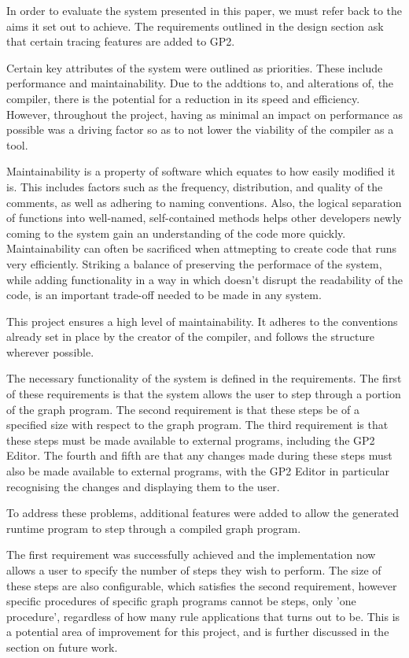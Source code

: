 \documentclass{UoYCSproject}
\begin{document}
In order to evaluate the system presented in this paper, we must refer back to the aims it set out to achieve. The requirements outlined in the design section ask that certain tracing features are added to GP2. 

Certain key attributes of the system were outlined as priorities. These include performance and maintainability.
Due to the addtions to, and alterations of, the compiler, there is the potential for a reduction in its speed and efficiency. However, throughout the project, having as minimal an impact on performance as possible was a driving factor so as to not lower the viability of the compiler as a tool.

Maintainability is a property of software which equates to how easily modified it is. This includes factors such as the frequency, distribution, and quality of the comments, as well as adhering to naming conventions. Also, the logical separation of functions into well-named, self-contained methods helps other developers newly coming to the system gain an understanding of the code more quickly. Maintainability can often be sacrificed when attmepting to create code that runs very efficiently. Striking a balance of preserving the performace of the system, while adding functionality in a way in which doesn't disrupt the readability of the code, is an important trade-off needed to be made in any system.

This project ensures a high level of maintainability. It adheres to the conventions already set in place by the creator of the compiler, and follows the structure wherever possible.

The necessary functionality of the system is defined in the requirements. The first of these requirements is that the system allows the user to step through a portion of the graph program. The second requirement is that these steps be of a specified size with respect to the graph program. The third requirement is that these steps must be made available to external programs, including the GP2 Editor. The fourth and fifth are that any changes made during these steps must also be made available to external programs, with the GP2 Editor in particular recognising the changes and displaying them to the user.

To address these problems, additional features were added to allow the generated runtime program to step through a compiled graph program. 

The first requirement was successfully achieved and the implementation now allows a user to specify the number of steps they wish to perform. The size of these steps are also configurable, which satisfies the second requirement, however specific procedures of specific graph programs cannot be steps, only 'one procedure', regardless of how many rule applications that turns out to be. This is a potential area of improvement for this project, and is further discussed in the section on future work. 
\end{document}
